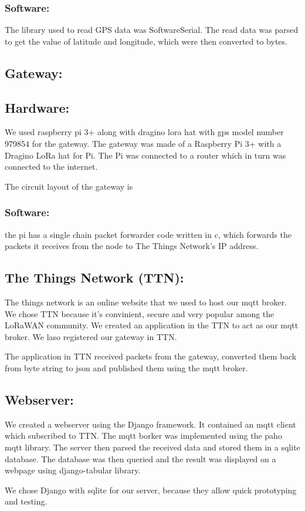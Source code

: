 \subsubsection{Software:}
The library used to read GPS data was SoftwareSerial. The read data was parsed to get the value of latitude and longitude, which were then converted to bytes.

\subsection{Gateway:}

\subsection{Hardware:}
We used raspberry pi 3+ along with dragino lora hat with gps model number 979854 for the gateway.
The gateway was made of a Raspberry Pi 3+ with a Dragino LoRa hat for Pi. The Pi was connected to a router which in turn was connected to the internet.


The circuit layout of the gateway is





\subsubsection{Software:}
the pi has a single chain packet forwarder code written in c, which forwards the packets it receives from the node to The Things Network's IP address. 


\subsection{The Things Network (TTN):}
The things network is an online website that we used to host our mqtt broker. We chose TTN because it's convinient, secure and very popular among the LoRaWAN community. We created an application in the TTN to act as our mqtt broker. We laso registered our gateway in TTN.

The application in TTN received packets from the gateway, converted them back from byte string to json and published them using the mqtt broker.


\subsection{Webserver:}
We created a webserver using the Django framework. It contained an mqtt client which subscribed to TTN. The mqtt borker was implemented using the paho mqtt library. The server then parsed the received data and stored them in a sqlite database. The database was then queried and the result was displayed on a webpage using django-tabular library.

We chose Django with sqlite for our server, because they allow quick prototyping and testing.

